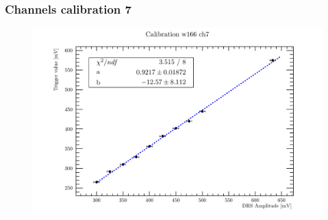 
\begin{frame} [fragile]
\small
	\frametitle{Channels calibration 7}
    		\begin{figure}
		 \centering
			\includegraphics[scale=0.5]{figures/ch7.pdf}
		\end{figure}  
\end{frame}